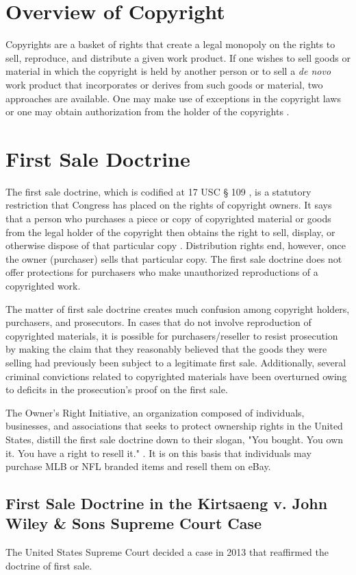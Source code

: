 \documentclass[letterpaper,11pt]{texMemo}
\begin{document}
\section*{Overview of Copyright}
  Copyrights are a basket of rights that create a legal monopoly on the rights to sell, reproduce, and distribute a given work product. If one wishes to sell goods or material in which the copyright is held by another person or to sell a \emph{de novo} work product that incorporates or derives from such goods or material, two approaches are available. One may make use of exceptions in the copyright laws or one may obtain authorization from the holder of the copyrights \cite{carnes}.

\section*{First Sale Doctrine}
  The first sale doctrine, which is codified at 17 USC § 109 \cite{17usc109}, is a statutory restriction that Congress has placed on the rights of copyright owners. It says that a person who purchases a piece or copy of copyrighted material or goods from the legal holder of the copyright then obtains the right to sell, display, or otherwise dispose of that particular copy \cite{crm1854}. Distribution rights end, however, once the owner (purchaser) sells that particular copy. The first sale doctrine does not offer protections for purchasers who make unauthorized reproductions of a copyrighted work.

  The matter of first sale doctrine creates much confusion among copyright holders, purchasers, and prosecutors. In cases that do not involve reproduction of copyrighted materials, it is possible for purchasers/reseller to resist prosecution by making the claim that they reasonably believed that the goods they were selling had previously been subject to a legitimate first sale. Additionally, several criminal convictions related to copyrighted materials have been overturned owing to deficits in the prosecution's proof on the first sale.

  The Owner's Right Initiative, an organization composed of individuals, businesses, and associations that seeks to protect ownership rights in the United States, distill the first sale doctrine down to their slogan, "You bought. You own it. You have a right to resell it." \cite{ownersrights}. It is on this basis that individuals may purchase MLB or NFL branded items and resell them on eBay.

  \subsection*{First Sale Doctrine in the Kirtsaeng v. John Wiley \& Sons Supreme Court Case}
    The United States Supreme Court decided a case in 2013 that reaffirmed the doctrine of first sale.
\end{document}
